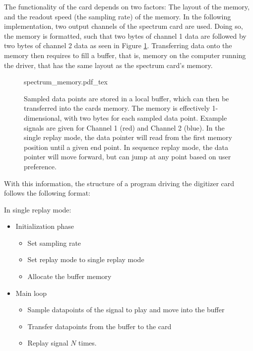 The functionality of the card depends on two factors: The layout of the memory, and the readout speed (the sampling rate) of the memory. In the following implementation, two output channels of the spectrum card are used. Doing so, the memory is formatted, such that two bytes of channel 1 data are followed by two bytes of channel 2 data as seen in Figure \ref{fig:spectrum_memory}. Transferring data onto the memory then requires to fill a buffer, that is, memory on the computer running the driver, that has the same layout as the spectrum card's memory.

\begin{figure}[ht]
\label{fig:spectrum_memory}
\centering
	{spectrum_memory.pdf_tex}
	\caption{Sampled data points are stored in a local buffer, which can then be transferred into the cards memory. The memory is effectively 1-dimensional, with two bytes for each sampled data point. Example signals are given for Channel 1 (red) and Channel 2 (blue). In the single replay mode, the data pointer will read from the first memory position until a given end point. In sequence replay mode, the data pointer will move forward, but can jump at any point based on user preference.}
\end{figure}

With this information, the structure of a program driving the digitizer card follows the following format:

\begin{minipage}{\textwidth}
In single replay mode:

\begin{itemize}
\setlength\itemsep{0.0em}
	\item Initialization phase
		\begin{itemize}
			\item Set sampling rate
			\item Set replay mode to single replay mode
			\item Allocate the buffer memory
		\end{itemize}
	\item Main loop
		\begin{itemize}
			\item Sample datapoints of the signal to play and move into the buffer
			\item Transfer datapoints from the buffer to the card
			\item Replay signal $N$ times.
		\end{itemize}
\end{itemize}
\end{minipage}

